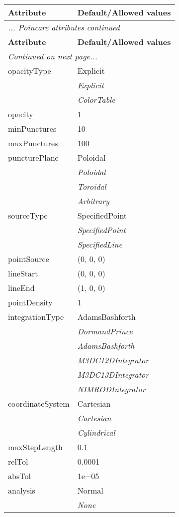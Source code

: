 \documentclass[10pt,a4paper]{report}
\begin{document}
\begin{longtable}{ll}
{\bf Attribute} & {\bf Default/Allowed values} \\
\hline \hline
\endfirsthead
\multicolumn{2}{l}{{\it ... Poincare attributes continued}} \\
{\bf Attribute} & {\bf Default/Allowed values} \\
\hline \hline
\endhead
\hline
\multicolumn{2}{l}{{\it Continued on next page...}} \\
\endfoot
\hline
\endlastfoot

opacityType  &  Explicit   \\
 & {\it  Explicit} \\
 & {\it  ColorTable} \\
opacity  &  1 \\
minPunctures  &  10 \\
maxPunctures  &  100 \\
puncturePlane  &  Poloidal   \\
 & {\it  Poloidal} \\
 & {\it  Toroidal} \\
 & {\it  Arbitrary} \\
sourceType  &  SpecifiedPoint   \\
 & {\it  SpecifiedPoint} \\
 & {\it  SpecifiedLine} \\
pointSource  &  (0, 0, 0) \\
lineStart  &  (0, 0, 0) \\
lineEnd  &  (1, 0, 0) \\
pointDensity  &  1 \\
integrationType  &  AdamsBashforth   \\
 & {\it  DormandPrince} \\
 & {\it  AdamsBashforth} \\
 & {\it  M3DC12DIntegrator} \\
 & {\it  M3DC13DIntegrator} \\
 & {\it  NIMRODIntegrator} \\
coordinateSystem  &  Cartesian   \\
 & {\it  Cartesian} \\
 & {\it  Cylindrical} \\
maxStepLength  &  0.1 \\
relTol  &  0.0001 \\
absTol  &  1e$-$05 \\
analysis  &  Normal   \\
 & {\it  None} \\

\end{longtable}
\end{document}
